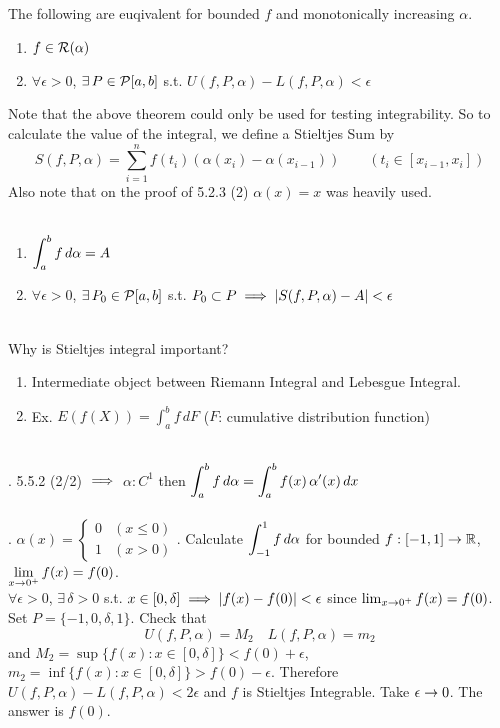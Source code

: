  The following are euqivalent for bounded $f$ and monotonically increasing $\alpha$.
\begin{enumerate}
	\item $f\in \mathcal{R}(\alpha)$
	\item $\forall\epsilon>0$, $\exists\,P\in \mathcal{P}[a, b]$ s.t. $U(f, P, \alpha) - L(f, P, \alpha) < \epsilon$
\end{enumerate}
Note that the above theorem could only be used for testing integrability. So to calculate the value of the integral, we define a Stieltjes Sum by
$$S(f, P, \alpha) = \sum_{i=1}^n f(t_i) (\alpha(x_i) - \alpha(x_{i-1})) \qquad (t_i \in [x_{i-1}, x_i])$$
Also note that on the proof of 5.2.3 (2) $\alpha(x) = x$ was heavily used.\\
\\
\begin{enumerate}
	\item $\displaystyle\int_a^b f\,d\alpha = A$
	\item $\forall\epsilon > 0$, $\exists \,P_0\in\mathcal{P}[a, b]$ s.t. $P_0\subset P \implies \left|S(f, P, \alpha) - A \right| < \epsilon$
\end{enumerate}~\\
Why is Stieltjes integral important?
\begin{enumerate}
	\item Intermediate object between Riemann Integral and Lebesgue Integral.
	\item Ex. $E(f(X)) = \int_a^b f \, dF$ ($F$: cumulative distribution function)
\end{enumerate}~\\
\rmk. 5.5.2 (2/2) $\implies$ $\alpha: C^1$ then $\displaystyle \int_a^b f\,d\alpha = \int_a^b f(x)\,\alpha'(x)\,dx$\\
\\
\ex. $\alpha(x) = \begin{cases}
	0 & (x\leq 0) \\ 1 & (x > 0)
\end{cases}$. Calculate $\displaystyle \int_{-1}^1 f\, d\alpha$ for bounded $f:[-1, 1]\rightarrow\mathbb{R}$, $\displaystyle \lim_{x\rightarrow0^{+}} f(x) = f(0)$.\\
$\forall \epsilon > 0$, $\exists\,\delta > 0$ s.t. $x\in [0, \delta] \implies \left|f(x)-f(0)\right| < \epsilon$ since $\lim_{x\rightarrow0^{+}} f(x) = f(0)$.\\
Set $P = \{-1, 0, \delta, 1\}$. Check that
$$U(f, P, \alpha) = M_2 \quad L(f, P, \alpha) = m_2$$
and $M_2 = \sup\{f(x): x\in [0, \delta]\} < f(0) + \epsilon$, $m_2 = \inf\{f(x):x\in [0, \delta]\} > f(0) - \epsilon$. Therefore $U(f, P, \alpha) - L(f, P, \alpha) < 2\epsilon$ and $f$ is Stieltjes Integrable. Take $\epsilon\rightarrow0$. The answer is $f(0)$.\\\\
